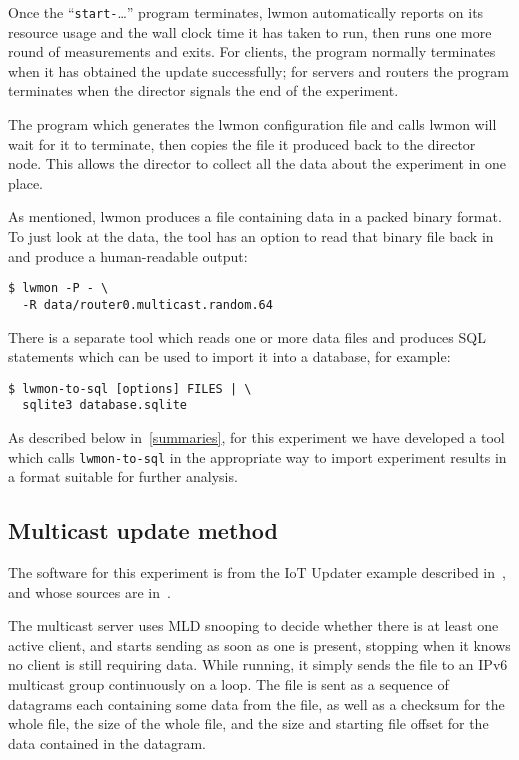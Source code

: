 \documentclass[a4paper,11pt,twocolumn]{article}
\begin{document}
Once the ``{\tt start-}\ldots'' program terminates, lwmon automatically
reports on its resource usage and the wall clock time it has taken to run,
then runs one more round of measurements and exits.  For clients, the
program normally terminates when it has obtained the update successfully;
for servers and routers the program terminates when the director signals
the end of the experiment.

The program which generates the lwmon configuration file and calls lwmon
will wait for it to terminate, then copies the file it produced back
to the director node. This allows the director to collect all the
data about the experiment in one place.

As mentioned, lwmon produces a file containing data in a packed binary
format. To just look at the data, the tool has an option to read that
binary file back in and produce a human-readable output:

\begin{small}
\begin{verbatim}
$ lwmon -P - \
  -R data/router0.multicast.random.64
\end{verbatim}
\end{small}

There is a separate tool which reads one or more data files and produces
SQL statements which can be used to import it into a database, for example:

\begin{small}
\begin{verbatim}
$ lwmon-to-sql [options] FILES | \
  sqlite3 database.sqlite
\end{verbatim}
\end{small}

As described below in~\ref{summaries}, for this experiment we have developed
a tool which calls {\tt lwmon-to-sql} in the appropriate way to import
experiment results in a format suitable for further analysis.

\subsection{Multicast update method}
\label{iotupd}

The software for this experiment is from the IoT Updater example described
in~\cite{iotupd:paper}, and whose sources are in~\cite{iotupd:sources}.

The multicast server uses MLD snooping to decide whether there is at
least one active client, and starts sending as soon as one is present,
stopping when it knows no client is still requiring data. While running,
it simply sends the file to an IPv6 multicast group continuously on a
loop. The file is sent as a sequence of datagrams each containing some
data from the file, as well as a checksum for the whole file, the size
of the whole file, and the size and starting file offset for the data
contained in the datagram.
\end{document}
